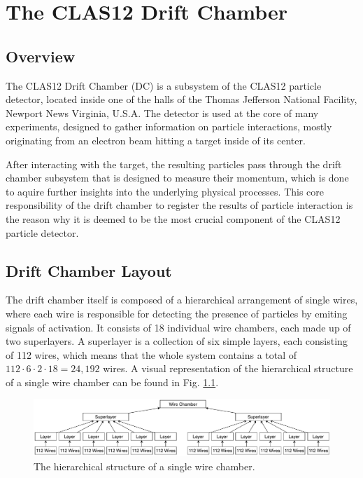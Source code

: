 \chapter{The CLAS12 Drift Chamber}

\section{Overview}

The CLAS12 Drift Chamber (DC) is a subsystem of the CLAS12 particle
detector, located inside one of the halls of the Thomas
Jefferson National Facility, Newport News Virginia, U.S.A. The
detector is used at the core of many experiments, designed to gather
information on particle interactions, mostly originating from an
electron beam hitting a target inside of its center.

After interacting with the target, the resulting particles pass
through the drift chamber subsystem that is designed to measure their
momentum, which is done to aquire further insights into the underlying
physical processes. This core responsibility of the drift chamber to
register the results of particle interaction is the reason why it is
deemed to be the most crucial component of the CLAS12 particle
detector.

\section{Drift Chamber Layout}

The drift chamber itself is composed of a hierarchical arrangement of
single wires, where each wire is responsible for detecting the presence of
particles by emiting signals of activation. It consists of 18
individual wire chambers, each made up of two superlayers. A
superlayer is a collection of six simple layers, each consisting of
112 wires, which means that the whole system contains a total of
\(112 \cdot 6 \cdot 2 \cdot 18 = 24,192\) wires.
A visual representation of the hierarchical structure of a
single wire chamber can be found in Fig. \ref{fig:wire-chamber}.
\begin{figure}[h]
  \centering
  \includegraphics[width=\textwidth]{../figures/wire_chamber}
  \caption{The hierarchical structure of a single wire chamber.}
  \label{fig:wire-chamber}
\end{figure}

